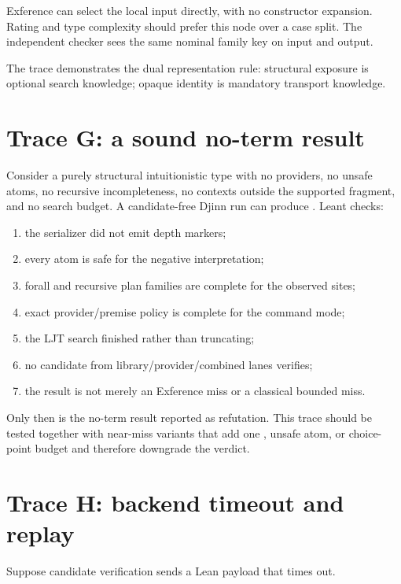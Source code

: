 \documentclass[10pt,letterpaper,oneside]{report}
\newcommand{\code}[1]{\texttt{\detokenize{#1}}}
\begin{document}
Exference can select the local input directly, with no constructor expansion. Rating and type complexity should prefer this node over a case split. The independent checker sees the same nominal family key on input and output.

The trace demonstrates the dual representation rule: structural exposure is optional search knowledge; opaque identity is mandatory transport knowledge.

\section{Trace G: a sound no-term result}

Consider a purely structural intuitionistic type with no providers, no unsafe atoms, no recursive incompleteness, no contexts outside the supported fragment, and no search budget. A candidate-free Djinn run can produce \code{ProvedUninhabitable}. Leant checks:

\begin{enumerate}
  \item the serializer did not emit depth markers;
  \item every atom is safe for the negative interpretation;
  \item forall and recursive plan families are complete for the observed sites;
  \item exact provider/premise policy is complete for the command mode;
  \item the LJT search finished rather than truncating;
  \item no candidate from library/provider/combined lanes verifies;
  \item the result is not merely an Exference miss or a classical bounded miss.
\end{enumerate}

Only then is the no-term result reported as refutation. This trace should be tested together with near-miss variants that add one \code{FDepth}, unsafe atom, or choice-point budget and therefore downgrade the verdict.

\section{Trace H: backend timeout and replay}

Suppose candidate verification sends a Lean payload that times out.
\end{document}
